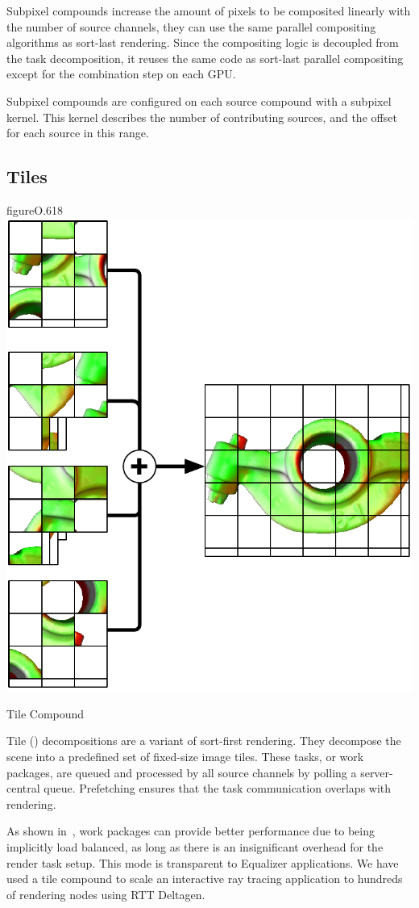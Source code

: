 Subpixel compounds increase the amount of pixels to be composited linearly with
the number of source channels, they can use the same parallel compositing
algorithms as sort-last rendering. Since the compositing logic is decoupled
from the task decomposition, it reuses the same code as sort-last parallel
compositing except for the combination step on each GPU.

Subpixel compounds are configured on each source compound with a subpixel
kernel. This kernel describes the number of contributing sources, and the
offset for each source in this range.

\subsection{Tiles \label{sTile}}

\begin{wrapfloat}{figure}{O}{.618\textwidth}
 \includegraphics[width=.618\textwidth]{images/tile}
 {\caption{\label{fTile}Tile Compound}}
\end{wrapfloat}

Tile () decompositions are a variant of sort-first rendering. They
decompose the scene into a predefined set of fixed-size image tiles. These
tasks, or work packages, are queued and processed by all source channels by
polling a server-central queue. Prefetching ensures that the task communication
overlaps with rendering.

As shown in~\cite{SPEP:16}, work packages can provide better performance due to
being implicitly load balanced, as long as there is an insignificant overhead
for the render task setup. This mode is transparent to \textsf{Equalizer}
applications. We have used a tile compound to scale an interactive ray tracing
application to hundreds of rendering nodes using RTT Deltagen.

